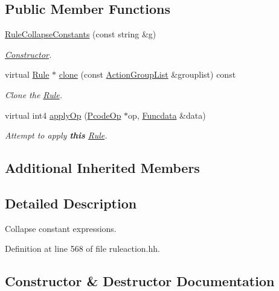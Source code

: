 \subsection*{Public Member Functions}
\begin{DoxyCompactItemize}
\item 
\mbox{\hyperlink{class_rule_collapse_constants_a9dc95c131333aa043266d182f16fa684}{Rule\+Collapse\+Constants}} (const string \&g)
\begin{DoxyCompactList}\small\item\em \mbox{\hyperlink{class_constructor}{Constructor}}. \end{DoxyCompactList}\item 
virtual \mbox{\hyperlink{class_rule}{Rule}} $\ast$ \mbox{\hyperlink{class_rule_collapse_constants_a72200e198cae9d858f56dab54bd476de}{clone}} (const \mbox{\hyperlink{class_action_group_list}{Action\+Group\+List}} \&grouplist) const
\begin{DoxyCompactList}\small\item\em Clone the \mbox{\hyperlink{class_rule}{Rule}}. \end{DoxyCompactList}\item 
virtual int4 \mbox{\hyperlink{class_rule_collapse_constants_a9dbb37c234aa8599bed3e916bdc15147}{apply\+Op}} (\mbox{\hyperlink{class_pcode_op}{Pcode\+Op}} $\ast$op, \mbox{\hyperlink{class_funcdata}{Funcdata}} \&data)
\begin{DoxyCompactList}\small\item\em Attempt to apply {\bfseries{this}} \mbox{\hyperlink{class_rule}{Rule}}. \end{DoxyCompactList}\end{DoxyCompactItemize}
\subsection*{Additional Inherited Members}


\subsection{Detailed Description}
Collapse constant expressions. 

Definition at line 568 of file ruleaction.\+hh.



\subsection{Constructor \& Destructor Documentation}
\mbox{\label{class_rule_collapse_constants_a9dc95c131333aa043266d182f16fa684}} 
